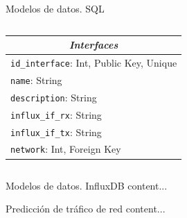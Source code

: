\documentclass[aspectratio=169,xcolor=dvipsnames]{beamer}
\begin{document}
\begin{frame}{Modelos de datos. SQL}
\begin{columns}
			\begin{column}{0.5\textwidth}
				\begin{table}[h!]
					\centering
					\begin{tabular}{|l|}
						\hline
						\multicolumn{1}{|c|}{\textit{\textbf{Interfaces}}} \\ \hline
						\texttt{id\_interface}: Int, Public Key, Unique             \\ \hline
						\texttt{name}: String                                       \\ \hline
						\texttt{description}: String                                \\ \hline
						\texttt{influx\_if\_rx}: String                             \\ \hline
						\texttt{influx\_if\_tx}: String                             \\ \hline
						\texttt{network}: Int, Foreign Key                          \\ \hline
					\end{tabular}
				\end{table}
			\end{column}
		\end{columns}
	\end{frame}

	\begin{frame}{Modelos de datos. InfluxDB}
		content...
	\end{frame}
	
	
	\begin{frame}{Predicción de tráfico de red}
		content...
	\end{frame}
	
	
\end{document}
